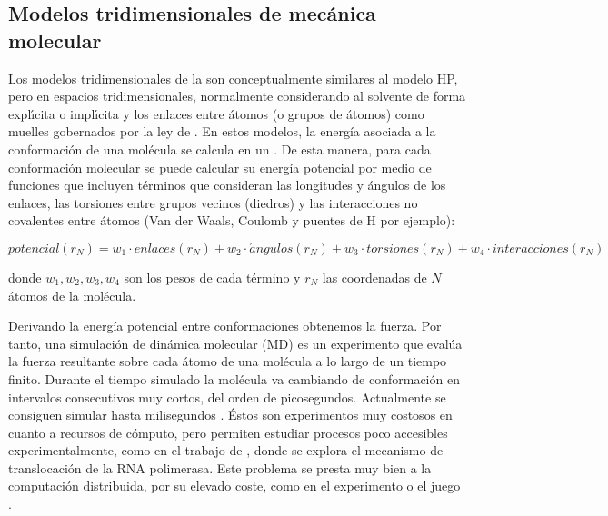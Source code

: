 \subsection{Modelos tridimensionales de mec\'{a}nica molecular} \label{DM}

Los modelos tridimensionales de la 
son conceptualmente similares al modelo HP, pero en espacios tridimensionales, normalmente considerando al solvente de forma 
expl\'\i{}cita o impl\'\i{}cita y los enlaces entre \'{a}tomos (o grupos de \'{a}tomos) como muelles gobernados por la ley de 
. En estos modelos, la energ\'{i}a asociada 
a la conformaci\'{o}n
de una mol\'{e}cula se calcula en un .
De esta manera, para cada conformaci\'{o}n molecular se puede calcular su energ\'{i}a potencial por medio de funciones que 
incluyen t\'{e}rminos que consideran las longitudes y \'{a}ngulos de los enlaces, 
las torsiones entre grupos vecinos (diedros) y las interacciones no covalentes entre \'{a}tomos (Van der Waals, Coulomb y puentes de H por ejemplo):

\begin{equation}
potencial(r_{N}) = w_{1} \cdot enlaces(r_{N}) + w_{2} \cdot \acute{a}ngulos(r_{N}) + w_{3} \cdot torsiones(r_{N}) + w_{4} \cdot interacciones(r_{N})
\label{eq:PnR}
\end{equation} 

donde $w_{1},w_{2},w_{3},w_{4}$ son los pesos de cada t\'{e}rmino y 
$r_{N}$ las coordenadas de $N$ \'{a}tomos de la mol\'{e}cula. 

Derivando la energ\'{i}a potencial entre conformaciones obtenemos la fuerza.
Por tanto, una simulaci\'{o}n de din\'{a}mica molecular (MD) es un experimento que eval\'{u}a la fuerza resultante sobre cada \'{a}tomo de una mol\'{e}cula 
a lo largo de un tiempo finito. Durante el tiempo simulado la mol\'{e}cula va cambiando de conformaci\'{o}n en intervalos consecutivos 
muy cortos, del orden de picosegundos. Actualmente se consiguen simular hasta milisegundos \citep{Shaw2010}.
\'{E}stos son experimentos muy costosos en cuanto a recursos de c\'{o}mputo, pero permiten estudiar procesos poco accesibles experimentalmente, 
como en el trabajo de \citet{Golosov2010}, donde se explora el mecanismo de translocaci\'{o}n de la RNA polimerasa. 
Este problema se presta muy bien a la computaci\'{o}n distribuida, por su elevado coste, como en el experimento 
 o el juego 
.

